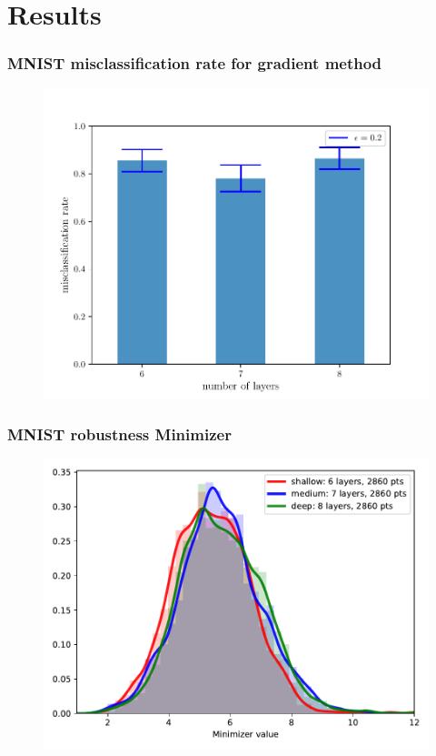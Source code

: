 \documentclass[handout]{beamer}
\begin{document}
\section{Results}

\begin{frame}
\frametitle{MNIST misclassification rate for gradient method} 
\begin{figure}
\includegraphics[width=0.9\linewidth]{../figures/mnist_grad_misclassificationrate.pdf}
\end{figure}
\end{frame}

\begin{frame}
\frametitle{MNIST robustness Minimizer} 
\begin{figure}
\includegraphics[width=0.9\linewidth]{../figures/plot_mnist_robustness_minimizer.pdf}
\end{figure}
\end{frame}
\end{document}
